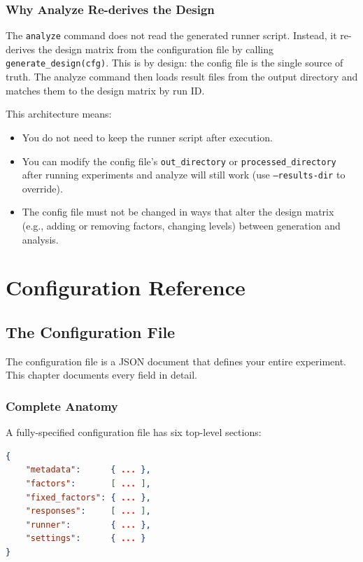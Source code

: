 \documentclass[11pt]{book}
\begin{document}
\section{Why Analyze Re-derives the Design}

The \texttt{analyze} command does not read the generated runner script. Instead, it re-derives the design matrix from the configuration file by calling \texttt{generate\_design(cfg)}. This is by design: the config file is the single source of truth. The analyze command then loads result files from the output directory and matches them to the design matrix by run ID.

This architecture means:
\begin{itemize}
  \item You do not need to keep the runner script after execution.
  \item You can modify the config file's \texttt{out\_directory} or \texttt{processed\_directory} after running experiments and analyze will still work (use \texttt{--results-dir} to override).
  \item The config file must not be changed in ways that alter the design matrix (e.g., adding or removing factors, changing levels) between generation and analysis.
\end{itemize}


\part{Configuration Reference}

\chapter{The Configuration File}
\label{ch:config}

The configuration file is a JSON document that defines your entire experiment. This chapter documents every field in detail.

\section{Complete Anatomy}

A fully-specified configuration file has six top-level sections:

\begin{lstlisting}[language=json]
{
    "metadata":      { ... },
    "factors":       [ ... ],
    "fixed_factors": { ... },
    "responses":     [ ... ],
    "runner":        { ... },
    "settings":      { ... }
}
\end{lstlisting}
\end{document}
